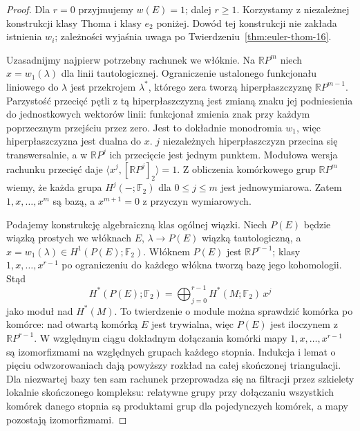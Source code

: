 \documentclass[11pt,a4paper,oneside]{report}
\newcommand{\R}{\mathbb{R}}
\theoremstyle{plain}
\theoremstyle{definition}
\theoremstyle{remark}
\begin{document}
\begin{proof}
Dla $r=0$ przyjmujemy $w(E)=1$; dalej $r\geq1$.
Korzystamy z niezależnej konstrukcji klasy Thoma
i klasy $e_2$ poniżej. Dowód tej konstrukcji nie
zakłada istnienia $w_i$; zależności wyjaśnia uwaga
po Twierdzeniu~\ref{thm:euler-thom-16}.

Uzasadnijmy najpierw potrzebny rachunek we włóknie.
Na $\R P^m$ niech $x=w_1(\lambda)$ dla linii
tautologicznej. Ograniczenie ustalonego funkcjonału
liniowego do $\lambda$ jest przekrojem $\lambda^*$,
którego zera tworzą hiperpłaszczyznę $\R P^{m-1}$.
Parzystość przecięć pętli z tą hiperpłaszczyzną
jest zmianą znaku jej podniesienia do jednostkowych
wektorów linii: funkcjonał zmienia znak przy każdym
poprzecznym przejściu przez zero. Jest to dokładnie
monodromia $w_1$, więc hiperpłaszczyzna jest dualna do $x$.
$j$ niezależnych hiperpłaszczyzn przecina się
transwersalnie, a w $\R P^j$ ich przecięcie jest
jednym punktem. Modułowa wersja rachunku przecięć daje
$\langle x^j,[\R P^j]_2\rangle=1$.
Z obliczenia komórkowego grup $\R P^m$ wiemy, że
każda grupa $H^j(-;\mathbb F_2)$ dla $0\leq j\leq m$
jest jednowymiarowa. Zatem $1,x,\ldots,x^m$ są bazą,
a $x^{m+1}=0$ z przyczyn wymiarowych.

Podajemy konstrukcję algebraiczną klas ogólnej wiązki.
Niech $P(E)$ będzie wiązką
prostych we włóknach $E$,
$\lambda\to P(E)$ wiązką
tautologiczną, a
$x=w_1(\lambda)\in
H^1(P(E);\mathbb F_2)$.
Włóknem $P(E)$ jest
$\R P^{r-1}$; klasy
$1,x,\ldots,x^{r-1}$
po ograniczeniu do
każdego włókna tworzą
bazę jego kohomologii.
Stąd
\[
 H^*(P(E);\mathbb F_2)
  =\bigoplus_{j=0}^{r-1}
     H^*(M;\mathbb F_2)\,x^j
\]
jako moduł nad $H^*(M)$.
To twierdzenie o module
można sprawdzić komórka
po komórce: nad otwartą
komórką $E$ jest
trywialna, więc
$P(E)$ jest iloczynem
z $\R P^{r-1}$.
W względnym ciągu
dokładnym dołączania
komórki mapy
$1,x,\ldots,x^{r-1}$
są izomorfizmami na
względnych grupach
każdego stopnia.
Indukcja i lemat
o pięciu odwzorowaniach
dają powyższy rozkład
na całej skończonej
triangulacji. Dla
niezwartej bazy
ten sam rachunek
przeprowadza się
na filtracji przez
szkielety lokalnie
skończonego kompleksu:
relatywne grupy przy
dołączaniu wszystkich
komórek danego stopnia
są produktami grup
dla pojedynczych komórek,
a mapy pozostają
izomorfizmami.


\end{proof}
\end{document}
